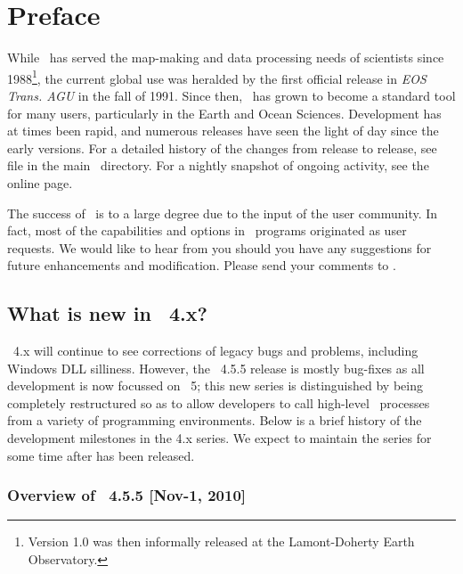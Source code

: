 %
%
\chapter{Preface} 
\label{ch:1}
\thispagestyle{headings}

While \GMT\ has served the map-making and data processing needs of scientists since 1988\footnote{Version
1.0 was then informally released at the Lamont-Doherty Earth Observatory.}, the current global use was
heralded by the first official release in \emph{EOS Trans. AGU} in the fall of 1991.  Since then,
\GMT\ has grown to become a standard tool for many users, particularly in the Earth and Ocean Sciences.
Development has at times been rapid, and numerous releases have seen the light of day since the early
versions.  For a detailed history of the changes from release to release, see file 
in the main \GMT\ directory.  For a nightly snapshot of ongoing activity, see the online
 page.

The success of \GMT\ is to a large degree due to the input of the user community. In fact, most of the
capabilities and options in \GMT\ programs originated as user requests.
We would like to hear from you should you have any suggestions for future enhancements and modification.
Please send your comments to
.

\section{What is new in \gmt\ 4.x?}

\GMT\ 4.x will continue to see corrections of legacy bugs and problems, including Windows DLL silliness.
However, the \GMT\ 4.5.5 release is mostly bug-fixes as all development is now focussed on \GMT\ 5; this
new series is distinguished by being completely restructured so as to allow developers to call
high-level \GMT\ processes from a variety of programming environments.  Below is a brief
history of the development milestones in the 4.x series.  We expect to maintain the  series
for some time after  has been released.

\subsection{Overview of \gmt\ 4.5.5 [Nov-1, 2010]}

